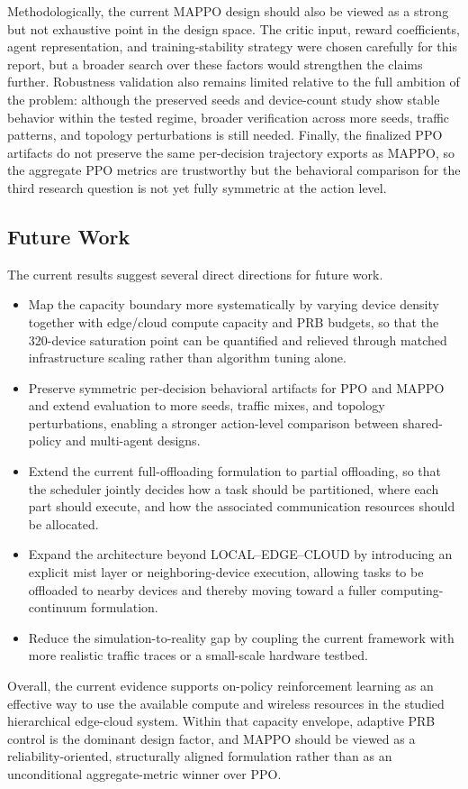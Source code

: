 Methodologically, the current MAPPO design should also be viewed as a strong but not exhaustive point in the design space. The critic input, reward coefficients, agent representation, and training-stability strategy were chosen carefully for this report, but a broader search over these factors would strengthen the claims further. Robustness validation also remains limited relative to the full ambition of the problem: although the preserved seeds and device-count study show stable behavior within the tested regime, broader verification across more seeds, traffic patterns, and topology perturbations is still needed. Finally, the finalized PPO artifacts do not preserve the same per-decision trajectory exports as MAPPO, so the aggregate PPO metrics are trustworthy but the behavioral comparison for the third research question is not yet fully symmetric at the action level.

\subsection{Future Work}
\label{subsec:conclusion-future}

The current results suggest several direct directions for future work.
\begin{itemize}
    \item Map the capacity boundary more systematically by varying device density together with edge/cloud compute capacity and PRB budgets, so that the 320-device saturation point can be quantified and relieved through matched infrastructure scaling rather than algorithm tuning alone.
    \item Preserve symmetric per-decision behavioral artifacts for PPO and MAPPO and extend evaluation to more seeds, traffic mixes, and topology perturbations, enabling a stronger action-level comparison between shared-policy and multi-agent designs.
    \item Extend the current full-offloading formulation to partial offloading, so that the scheduler jointly decides how a task should be partitioned, where each part should execute, and how the associated communication resources should be allocated.
    \item Expand the architecture beyond LOCAL--EDGE--CLOUD by introducing an explicit mist layer or neighboring-device execution, allowing tasks to be offloaded to nearby devices and thereby moving toward a fuller computing-continuum formulation.
    \item Reduce the simulation-to-reality gap by coupling the current framework with more realistic traffic traces or a small-scale hardware testbed.
\end{itemize}

Overall, the current evidence supports on-policy reinforcement learning as an effective way to use the available compute and wireless resources in the studied hierarchical edge-cloud system. Within that capacity envelope, adaptive PRB control is the dominant design factor, and MAPPO should be viewed as a reliability-oriented, structurally aligned formulation rather than as an unconditional aggregate-metric winner over PPO.
